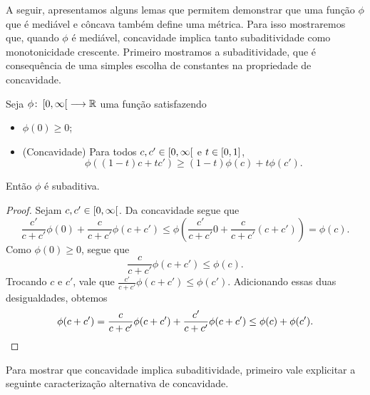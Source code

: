 A seguir, apresentamos alguns lemas que permitem demonstrar que uma função $\phi$ que é mediável e côncava também define uma métrica. Para isso mostraremos que, quando $\phi$ é mediável, concavidade implica tanto subaditividade como monotonicidade crescente. Primeiro mostramos a subaditividade, que é consequência de uma simples escolha de constantes na propriedade de concavidade.

\begin{lemma}
\label{lema:concavidade.implica.subaditividade}
Seja $\phi\colon \allowbreak \left[0,\allowbreak \infty\right[ \longrightarrow \mathbb{R}$ uma função satisfazendo
	\begin{itemize}
	\item $\phi(0) \geq 0$;
	\item (Concavidade) Para todos $c,c' \in \left[0,\allowbreak \infty\right[$ e $t \in \left[0,\allowbreak 1\right]$,
		\[
		\phi((1-t)c + tc') \geq (1-t)\phi(c) + t\phi(c').
		\]
	\end{itemize}
Então $\phi$ é subaditiva.
\end{lemma}
\begin{proof}
Sejam $c,c' \in \left[0,\allowbreak \infty\right[$. Da concavidade segue que
	\[
	\frac{c'}{c+c'}\phi(0) + \frac{c}{c+c'}\phi(c+c') \leq \phi\left(\frac{c'}{c+c'}0 + \frac{c}{c+c'}(c+c')\right) = \phi(c).
	\]
Como $\phi(0) \geq 0$, segue que
	\[
	\frac{c}{c+c'}\phi(c+c') \leq \phi(c).
	\]
Trocando $c$ e $c'$, vale que $\frac{c'}{c+c'}\phi(c+c') \leq \phi(c')$. Adicionando essas duas desigualdades, obtemos
	\[
	\phi(c+c') = \frac{c}{c+c'}\phi(c+c') + \frac{c'}{c+c'}\phi(c+c') \leq \phi(c) + \phi(c').
	\qedhere
	\]
\end{proof}

Para mostrar que concavidade implica subaditividade, primeiro vale explicitar a seguinte caracterização alternativa de concavidade.

